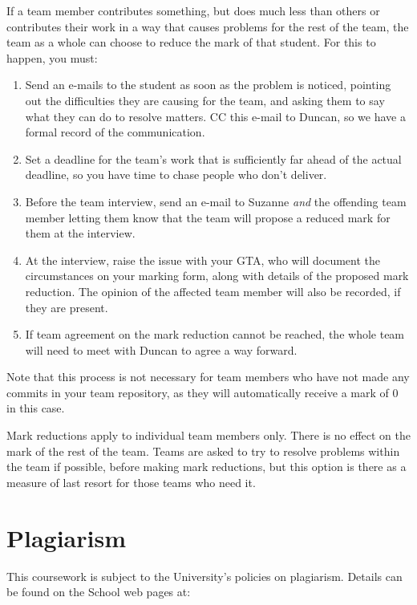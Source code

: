 \documentclass[
]{book}
\providecommand{\tightlist}{%
  \setlength{\itemsep}{0pt}\setlength{\parskip}{0pt}}
\begin{document}
If a team member contributes something, but does much less than others or contributes their work in a way that causes problems for the rest of the team, the team as a whole can choose to reduce the mark of that student. For this to happen, you must:

\begin{enumerate}
\def\labelenumi{\arabic{enumi}.}
\tightlist
\item
  Send an e-mails to the student as soon as the problem is noticed, pointing out the difficulties they are causing for the team, and asking them to say what they can do to resolve matters. CC this e-mail to Duncan, so we have a formal record of the communication.
\item
  Set a deadline for the team's work that is sufficiently far ahead of the actual deadline, so you have time to chase people who don't deliver.
\item
  Before the team interview, send an e-mail to Suzanne \emph{and} the offending team member letting them know that the team will propose a reduced mark for them at the interview.
\item
  At the interview, raise the issue with your GTA, who will document the circumstances on your marking form, along with details of the proposed mark reduction. The opinion of the affected team member will also be recorded, if they are present.
\item
  If team agreement on the mark reduction cannot be reached, the whole team will need to meet with Duncan to agree a way forward.
\end{enumerate}

Note that this process is not necessary for team members who have not made any commits in your team repository, as they will automatically receive a mark of 0 in this case.

Mark reductions apply to individual team members only. There is no effect on the mark of the rest of the team. Teams are asked to try to resolve problems within the team if possible, before making mark reductions, but this option is there as a measure of last resort for those teams who need it.

\hypertarget{plagiarism-1}{%
\section{Plagiarism}\label{plagiarism-1}}

This coursework is subject to the University's policies on plagiarism. Details can be found on the School web pages at:
\end{document}
